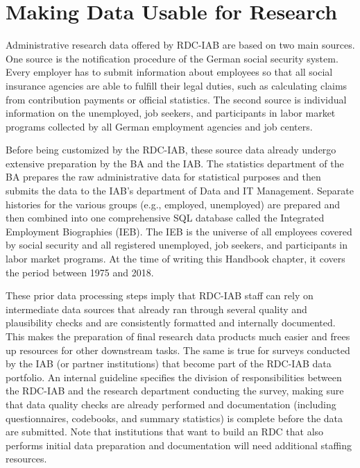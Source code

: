 \hypertarget{making-data-usable-for-research}{%
\section{Making Data Usable for Research}\label{making-data-usable-for-research}}

Administrative research data offered by RDC-IAB are based on two main sources. One source is the notification procedure of the German social security system. Every employer has to submit information about employees so that all social insurance agencies are able to fulfill their legal duties, such as calculating claims from contribution payments or official statistics. The second source is individual information on the unemployed, job seekers, and participants in labor market programs collected by all German employment agencies and job centers.

Before being customized by the RDC-IAB, these source data already undergo extensive preparation by the BA and the IAB. The statistics department of the BA prepares the raw administrative data for statistical purposes and then submits the data to the IAB's department of Data and IT Management. Separate histories for the various groups (e.g., employed, unemployed) are prepared and then combined into one comprehensive SQL database called the Integrated Employment Biographies (IEB). The IEB is the universe of all employees covered by social security and all registered unemployed, job seekers, and participants in labor market programs. At the time of writing this Handbook chapter, it covers the period between 1975 and 2018.

These prior data processing steps imply that RDC-IAB staff can rely on intermediate data sources that already ran through several quality and plausibility checks and are consistently formatted and internally documented. This makes the preparation of final research data products much easier and frees up resources for other downstream tasks. The same is true for surveys conducted by the IAB (or partner institutions) that become part of the RDC-IAB data portfolio. An internal guideline specifies the division of responsibilities between the RDC-IAB and the research department conducting the survey, making sure that data quality checks are already performed and documentation (including questionnaires, codebooks, and summary statistics) is complete before the data are submitted. Note that institutions that want to build an RDC that also performs initial data preparation and documentation will need additional staffing resources.

